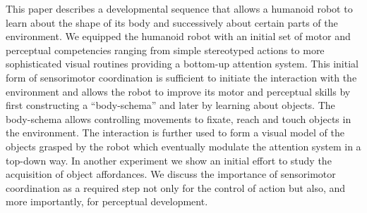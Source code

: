 This paper describes a developmental sequence that allows a humanoid robot to learn about the shape of its body and successively about certain parts of the environment. We equipped the humanoid robot with an initial set of motor and perceptual competencies ranging from simple stereotyped actions to more sophisticated visual routines providing a bottom-up attention system. This initial form of sensorimotor coordination is sufficient to initiate the interaction with the environment and allows the robot to improve its motor and perceptual skills by first constructing a ``body-schema'' and later by learning about objects. The body-schema allows controlling movements to fixate, reach and touch objects in the environment. The interaction is further used to form a visual model of the objects grasped by the robot which eventually modulate the attention system in a top-down way. In another experiment we show an initial effort to study the acquisition of object affordances. We discuss the importance of sensorimotor coordination as a required step not only for the control of action but also, and more importantly, for perceptual development.